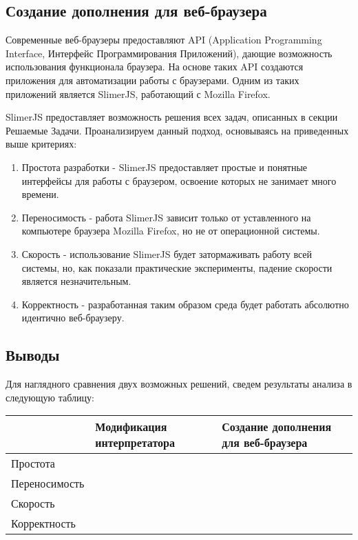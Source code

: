 \subsection{Создание дополнения для веб-браузера}
	Современные веб-браузеры предоставляют API (Application Programming Interface, Интерфейс Программирования Приложений), дающие возможность использования функционала браузера. На основе таких API создаются приложения для автоматизации работы с браузерами. Одним из таких приложений является SlimerJS, работающий с Mozilla Firefox. 


	SlimerJS предоставляет возможность решения всех задач, описанных в секции Решаемые Задачи. Проанализируем данный подход, основываясь на приведенных выше критериях:

	\bigskip
	\begin{enumerate}
		\item Простота разработки - SlimerJS предоставляет простые и понятные интерфейсы для работы с браузером, освоение которых не занимает много времени.
		\item Переносимость - работа SlimerJS зависит только от уставленного на компьютере браузера Mozilla Firefox, но не от операционной системы.
		\item Скорость - использование SlimerJS будет затормаживать работу всей системы, но, как показали практические эксперименты, падение скорости является незначительным.
		\item Корректность - разработанная таким образом среда будет работать абсолютно идентично веб-браузеру.
	\end{enumerate}
	\bigskip

\subsection{Выводы}
	Для наглядного сравнения двух возможных решений, сведем результаты анализа в следующую таблицу:

	\begin{table}[h]
		\centering
		\label{my-label}
	\begin{tabular}{|l|l|l|}
	\hline
	              & Модификация интерпретатора                      & Создание дополнения для веб-браузера \\ \hline
	Простота      & \cellcolor[HTML]{CB0000}                        & \cellcolor[HTML]{32CB00}             \\ \hline
	Переносимость & \cellcolor[HTML]{CB0000}                        & \cellcolor[HTML]{32CB00}             \\ \hline
	Скорость      & \cellcolor[HTML]{32CB00} 						& \cellcolor[HTML]{FFC702}             \\ \hline
	Корректность  & \cellcolor[HTML]{32CB00}                        & \cellcolor[HTML]{32CB00}             \\ \hline
	\end{tabular}
	\end{table}


